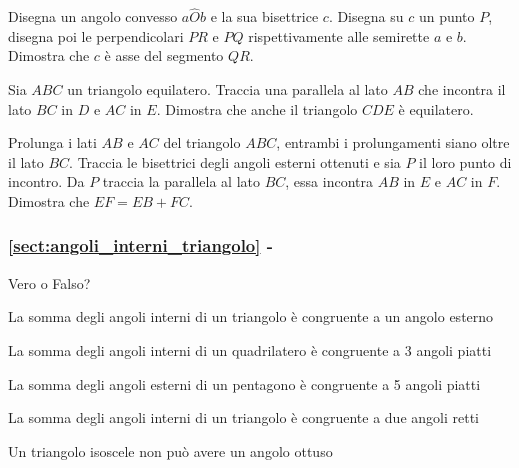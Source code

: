 \begin{multicols}{2}
\begin{esercizio}
\label{ese:3.44}
Disegna un angolo convesso $a\widehat{O}b$ e la sua bisettrice $c$. Disegna su $c$ un punto $P$, disegna poi le perpendicolari $PR$ e $PQ$ rispettivamente alle semirette $a$ e $b$. Dimostra che $c$ è asse del segmento $QR$.
\end{esercizio}

\begin{esercizio}
\label{ese:3.45}
Sia $ABC$ un triangolo equilatero. Traccia una parallela al lato $AB$ che incontra il lato $BC$ in $D$ e $AC$ in $E$. Dimostra che anche il triangolo $CDE$ è equilatero.
\end{esercizio}

\begin{esercizio}
\label{ese:3.46}
Prolunga i lati $AB$ e $AC$ del triangolo $ABC$, entrambi i prolungamenti siano oltre il lato $BC$. Traccia le bisettrici degli angoli esterni ottenuti e sia $P$ il loro punto di incontro. Da $P$ traccia la parallela al lato $BC$, essa incontra $AB$ in $E$ e $AC$ in $F$. Dimostra che $EF=EB+FC$.
\end{esercizio}
\end{multicols}

\begingroup
\hypersetup{linkcolor=black}
\subsubsection*{\ref{sect:angoli_interni_triangolo} - }
\endgroup

\begin{esercizio}
\label{ese:3.47}
Vero o Falso?
\begin{enumeratea}
\item La somma degli angoli interni di un triangolo è congruente a un angolo esterno\tab\tab\hfill\boxV\quad\boxF
\item La somma degli angoli interni di un quadrilatero è congruente a 3 angoli piatti\tab\tab\hfill\boxV\quad\boxF
\item La somma degli angoli esterni di un pentagono è congruente a 5 angoli piatti\hfill\boxV\quad\boxF
\item La somma degli angoli interni di un triangolo è congruente a due angoli retti\hfill\boxV\quad\boxF
\item Un triangolo isoscele non può avere un angolo ottuso\hfill\boxV\quad\boxF
\end{enumeratea}
\end{esercizio}

